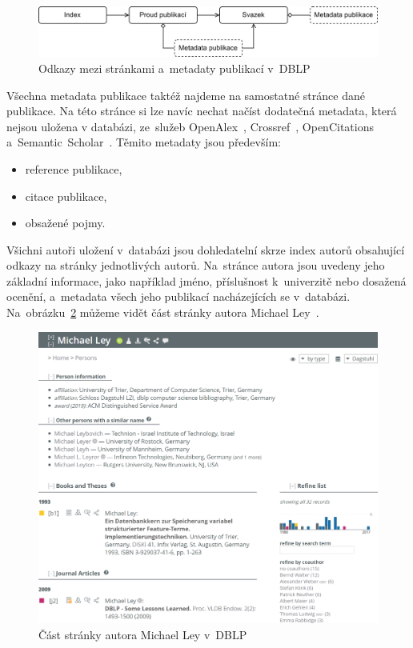 \documentclass[
  biblatex,
  sourcecodes,
  glossaries,
  index
]{kidiplom}
\begin{document}
\begin{figure}[H]
\begin{center}
\includegraphics[width=\textwidth]{typy_stranek_odkazy}
\caption{Odkazy mezi stránkami a~metadaty publikací v~DBLP}\label{fig:typy_stranek_odkazy}
\end{center}
\end{figure}

Všechna metadata publikace taktéž najdeme na samostatné stránce dané publikace. Na této stránce si lze navíc nechat načíst dodatečná metadata, která nejsou uložena v databázi, ze~služeb OpenAlex~\cite{t02}, Crossref~\cite{t03}, OpenCitations~\cite{t04} a~Semantic~Scholar~\cite{t05}. Těmito metadaty jsou především:
\begin{itemize}
\item reference publikace,
\item citace publikace,
\item obsažené pojmy.
\end{itemize}

Všichni autoři uložení v~databázi jsou dohledatelní skrze index autorů obsahující odkazy na stránky jednotlivých autorů. Na~stránce autora jsou uvedeny jeho základní informace, jako například jméno, příslušnost k~univerzitě nebo dosažená ocenění, a~metadata všech jeho publikací nacházejících se v~databázi. Na~obrázku~\ref{fig:michael_ley_dblp} můžeme vidět část stránky autora Michael Ley~\cite{t07}.

\begin{figure}[H]
\begin{center}
\includegraphics[width=\textwidth]{michael_ley_dblp}
\caption{Část stránky autora Michael Ley v~DBLP}\label{fig:michael_ley_dblp}
\end{center}
\end{figure}
\end{document}
